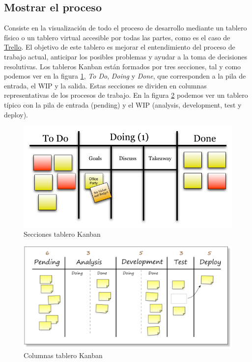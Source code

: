 	\subsection{Mostrar el proceso}
	Consiste en la visualización de todo el proceso de desarrollo mediante un tablero físico o un tablero virtual accesible por todas las partes, como es el caso de \href{https://trello.com/}{Trello}. El objetivo de este tablero es mejorar el entendimiento del proceso de trabajo actual, anticipar los posibles problemas y ayudar a la toma de decisiones resolutivas.
	Los tableros Kanban están formados por tres secciones, tal y como podemos ver en la figura \ref{fig:kanban_table_1}, \textit{To Do}, \textit{Doing} y \textit{Done}, que corresponden a la pila de entrada, el \ac{WIP} y la salida. Estas secciones se dividen en columnas representativas de los procesos de trabajo. En la figura \ref{fig:kanban_table_2} podemos ver un tablero típico con la pila de entrada (pending) y el \ac{WIP} (analysis, development, test y deploy).
	
	\begin{figure}[H]
	\centering
	\includegraphics[width=120mm, fbox={\fboxrule} 4mm]{images/04-metodo/02-kanban_table_1.png}
	\caption{Secciones tablero Kanban}
	\label{fig:kanban_table_1}
	\end{figure}
	
	\begin{figure}[H]
	\centering
	\includegraphics[width=120mm, fbox={\fboxrule} 4mm]{images/04-metodo/03-kanban_table_2.png}
	\caption{Columnas tablero Kanban}
	\label{fig:kanban_table_2}
	\end{figure}
	
